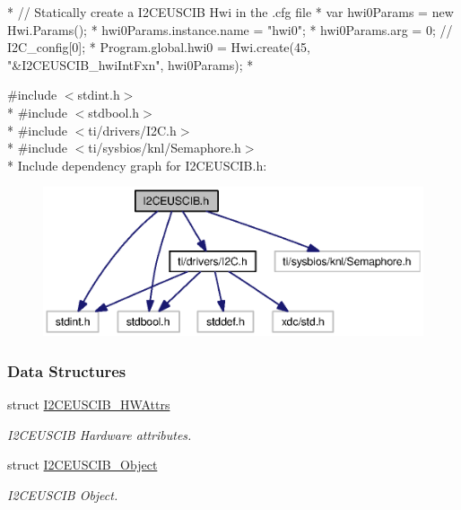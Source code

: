 \begin{DoxyCode}
*  \textcolor{comment}{// Statically create a I2CEUSCIB Hwi in the .cfg file}
*  var hwi0Params = \textcolor{keyword}{new} Hwi.Params();
*  hwi0Params.instance.name = \textcolor{stringliteral}{"hwi0"};
*  hwi0Params.arg = 0;  \textcolor{comment}{// I2C\_config[0];}
*  Program.global.hwi0 = Hwi.create(45, \textcolor{stringliteral}{"&I2CEUSCIB\_hwiIntFxn"}, hwi0Params);
*  
\end{DoxyCode}
 

{\ttfamily \#include $<$stdint.\-h$>$}\\*
{\ttfamily \#include $<$stdbool.\-h$>$}\\*
{\ttfamily \#include $<$ti/drivers/\-I2\-C.\-h$>$}\\*
{\ttfamily \#include $<$ti/sysbios/knl/\-Semaphore.\-h$>$}\\*
Include dependency graph for I2\-C\-E\-U\-S\-C\-I\-B.\-h\-:
\nopagebreak
\begin{figure}[H]
\begin{center}
\leavevmode
\includegraphics[width=350pt]{_i2_c_e_u_s_c_i_b_8h__incl}
\end{center}
\end{figure}
\subsubsection*{Data Structures}
\begin{DoxyCompactItemize}
\item 
struct \hyperlink{struct_i2_c_e_u_s_c_i_b___h_w_attrs}{I2\-C\-E\-U\-S\-C\-I\-B\-\_\-\-H\-W\-Attrs}
\begin{DoxyCompactList}\small\item\em I2\-C\-E\-U\-S\-C\-I\-B Hardware attributes. \end{DoxyCompactList}\item 
struct \hyperlink{struct_i2_c_e_u_s_c_i_b___object}{I2\-C\-E\-U\-S\-C\-I\-B\-\_\-\-Object}
\begin{DoxyCompactList}\small\item\em I2\-C\-E\-U\-S\-C\-I\-B Object. \end{DoxyCompactList}\end{DoxyCompactItemize}
